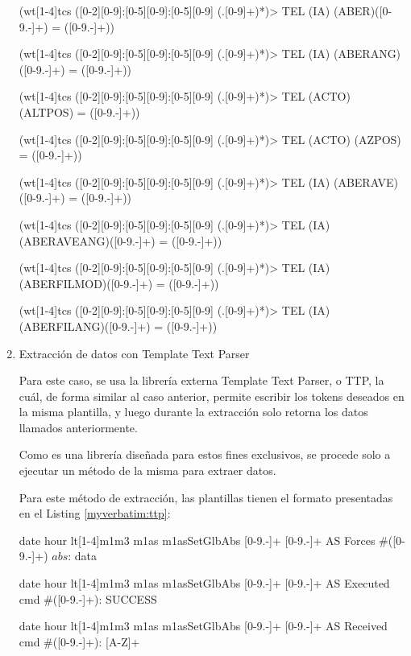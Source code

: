 \begin{enumerate}
\begin{myverbatim}[caption={Plantillas Regex},label={myverbatim:regex}]
(wt[1-4]tcs ([0-2][0-9]:[0-5][0-9]:[0-5][0-9]
(.[0-9]+)*)> TEL (IA) (ABER)([0-9.-]+) = ([0-9.-]+))

(wt[1-4]tcs ([0-2][0-9]:[0-5][0-9]:[0-5][0-9]
(.[0-9]+)*)> TEL (IA) (ABERANG)([0-9.-]+) = ([0-9.-]+))

(wt[1-4]tcs ([0-2][0-9]:[0-5][0-9]:[0-5][0-9]
(.[0-9]+)*)> TEL (ACTO) (ALTPOS) = ([0-9.-]+))

(wt[1-4]tcs ([0-2][0-9]:[0-5][0-9]:[0-5][0-9]
(.[0-9]+)*)> TEL (ACTO) (AZPOS) = ([0-9.-]+))

(wt[1-4]tcs ([0-2][0-9]:[0-5][0-9]:[0-5][0-9]
(.[0-9]+)*)> TEL (IA) (ABERAVE)([0-9.-]+) = ([0-9.-]+))

(wt[1-4]tcs ([0-2][0-9]:[0-5][0-9]:[0-5][0-9]
(.[0-9]+)*)> TEL (IA) (ABERAVEANG)([0-9.-]+) = 
([0-9.-]+))

(wt[1-4]tcs ([0-2][0-9]:[0-5][0-9]:[0-5][0-9]
(.[0-9]+)*)> TEL (IA) (ABERFILMOD)([0-9.-]+) = 
([0-9.-]+))

(wt[1-4]tcs ([0-2][0-9]:[0-5][0-9]:[0-5][0-9]
(.[0-9]+)*)> TEL (IA) (ABERFILANG)([0-9.-]+) = 
([0-9.-]+))
    
    \end{myverbatim}

    \item{Extracción de datos con Template Text Parser}

    Para este caso, se usa la librería externa Template Text Parser, o TTP, la cuál, de forma similar al caso anterior, permite escribir los tokens deseados en la misma plantilla, y luego durante la extracción solo retorna los datos llamados anteriormente.

    Como es una librería diseñada para estos fines exclusivos, se procede solo a ejecutar un método de la misma para extraer datos.

    Para este método de extracción, las plantillas tienen el formato presentadas en el Listing \ref{myverbatim:ttp}:

    \begin{myverbatim}[caption={Plantillas TTP},label={myverbatim:ttp}]

{{ date }} {{ hour }} lt[1-4]m1m3 m1as m1asSetGlbAbs 
[0-9.-]+ [0-9.-]+ AS Forces #([0-9.-]+) \(abs\): 
{{ data }}

{{ date }} {{ hour }} lt[1-4]m1m3 m1as m1asSetGlbAbs 
[0-9.-]+ [0-9.-]+ AS Executed cmd #([0-9.-]+): SUCCESS

{{ date }} {{ hour }} lt[1-4]m1m3 m1as m1asSetGlbAbs 
[0-9.-]+ [0-9.-]+ AS Received cmd #([0-9.-]+): [A-Z]+


\end{myverbatim}
\end{enumerate}
